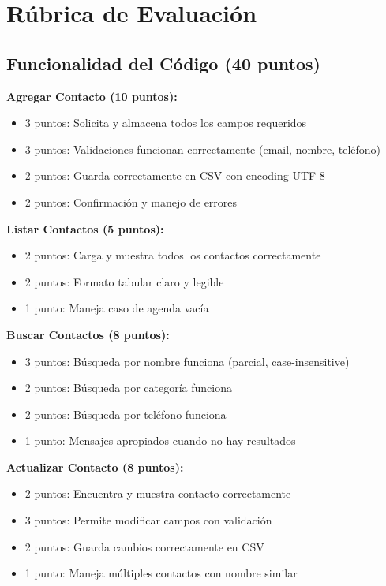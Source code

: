 \documentclass[11pt,letterpaper]{article}
\begin{document}
\section{Rúbrica de Evaluación}

\subsection{Funcionalidad del Código (40 puntos)}

\textbf{Agregar Contacto (10 puntos):}
\begin{itemize}
    \item 3 puntos: Solicita y almacena todos los campos requeridos
    \item 3 puntos: Validaciones funcionan correctamente (email, nombre, teléfono)
    \item 2 puntos: Guarda correctamente en CSV con encoding UTF-8
    \item 2 puntos: Confirmación y manejo de errores
\end{itemize}

\textbf{Listar Contactos (5 puntos):}
\begin{itemize}
    \item 2 puntos: Carga y muestra todos los contactos correctamente
    \item 2 puntos: Formato tabular claro y legible
    \item 1 punto: Maneja caso de agenda vacía
\end{itemize}

\textbf{Buscar Contactos (8 puntos):}
\begin{itemize}
    \item 3 puntos: Búsqueda por nombre funciona (parcial, case-insensitive)
    \item 2 puntos: Búsqueda por categoría funciona
    \item 2 puntos: Búsqueda por teléfono funciona
    \item 1 punto: Mensajes apropiados cuando no hay resultados
\end{itemize}

\textbf{Actualizar Contacto (8 puntos):}
\begin{itemize}
    \item 2 puntos: Encuentra y muestra contacto correctamente
    \item 3 puntos: Permite modificar campos con validación
    \item 2 puntos: Guarda cambios correctamente en CSV
    \item 1 punto: Maneja múltiples contactos con nombre similar
\end{itemize}
\end{document}
